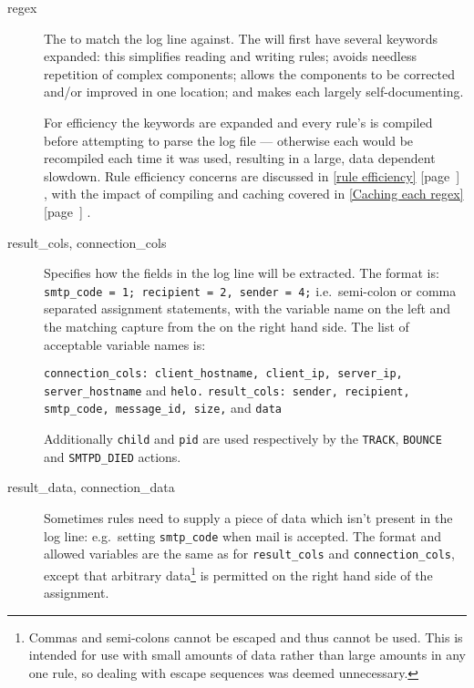 \documentclass[a4paper,12pt,draft]{article}
\newcommand{\refwithpage}[1]{%
    \empty{}\ref{#1} [page~\pageref{#1}]%
}
\newcommand{\sectionref}[1]{%
    \textsection{}\refwithpage{#1}%
}
\newcommand{\tab}[0]{%
    \hspace*{2em}%
}
\begin{document}
\begin{description}
    \item [regex] The \regex{} to match the log line against.  The \regex{}
        will first have several keywords expanded: this simplifies reading
        and writing rules; avoids needless repetition of complex \regex{}
        components; allows the components to be corrected and/or improved
        in one location; and makes each \regex{} largely self-documenting.

        For efficiency the keywords are expanded and every rule's \regex{}
        is compiled before attempting to parse the log file --- otherwise
        each \regex{} would be recompiled each time it was used, resulting
        in a large, data dependent slowdown.  Rule efficiency concerns are
        discussed in \sectionref{rule efficiency}, with the impact of
        compiling and caching \regexes{} covered in \sectionref{Caching
        each regex}.

    \item [result\_cols, connection\_cols] Specifies how the fields in the
        log line will be extracted.  The format is:
        \newline \tab{} \texttt{smtp\_code = 1; recipient = 2, sender = 4;}
        \newline i.e.\ semi-colon or comma separated assignment statements,
        with the variable name on the left and the matching capture from
        the \regex{} on the right hand side.  The list of acceptable
        variable names is:

        \texttt{connection\_cols: client\_hostname, client\_ip, server\_ip,
        \newline \tab{} server\_hostname} and \texttt{helo.\newline}
        \texttt{result\_cols: sender, recipient, smtp\_code, message\_id,
        \newline \tab{} size,} and \texttt{data}

        Additionally \texttt{child} and \texttt{pid} are used respectively
        by the \texttt{TRACK}, \texttt{BOUNCE} and \texttt{SMTPD\_DIED}
        actions.

    \item [result\_data, connection\_data] Sometimes rules need to supply a
        piece of data which isn't present in the log line: e.g.\ setting
        \texttt{smtp\_code} when mail is accepted.  The format and allowed
        variables are the same as for \texttt{result\_cols} and
        \texttt{connection\_cols}, except that arbitrary
        data\footnote{Commas and semi-colons cannot be escaped and thus
        cannot be used.  This is intended for use with small amounts of
        data rather than large amounts in any one rule, so dealing with
        escape sequences was deemed unnecessary.} is permitted on the right
        hand side of the assignment.


\end{description}
\end{document}
